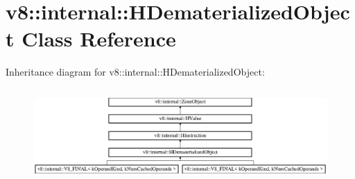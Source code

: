 \hypertarget{classv8_1_1internal_1_1_h_dematerialized_object}{}\section{v8\+:\+:internal\+:\+:H\+Dematerialized\+Object Class Reference}
\label{classv8_1_1internal_1_1_h_dematerialized_object}
Inheritance diagram for v8\+:\+:internal\+:\+:H\+Dematerialized\+Object\+:\begin{figure}[H]
\begin{center}
\leavevmode
\includegraphics[height=3.571428cm]{classv8_1_1internal_1_1_h_dematerialized_object}
\end{center}
\end{figure}
